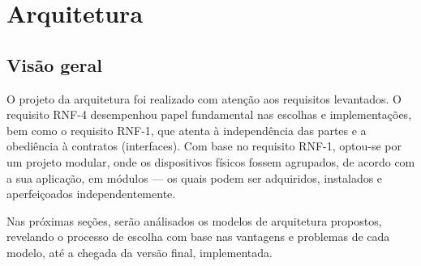 \chapter{Arquitetura}

\section{Visão geral}

O projeto da arquitetura foi realizado com atenção aos requisitos levantados. O requisito RNF-4 desempenhou papel fundamental nas escolhas e implementações, bem como o requisito RNF-1, que atenta à independência das partes e a obediência à contratos (interfaces). Com base no requisito RNF-1, optou-se por um projeto modular, onde os dispositivos físicos fossem agrupados, de acordo com a sua aplicação, em módulos --- os quais podem ser adquiridos, instalados e aperfeiçoados independentemente.

Nas próximas seções, serão análisados os modelos de arquitetura propostos, revelando o processo de escolha com base nas vantagens e problemas de cada modelo, até a chegada da versão final, implementada. 












